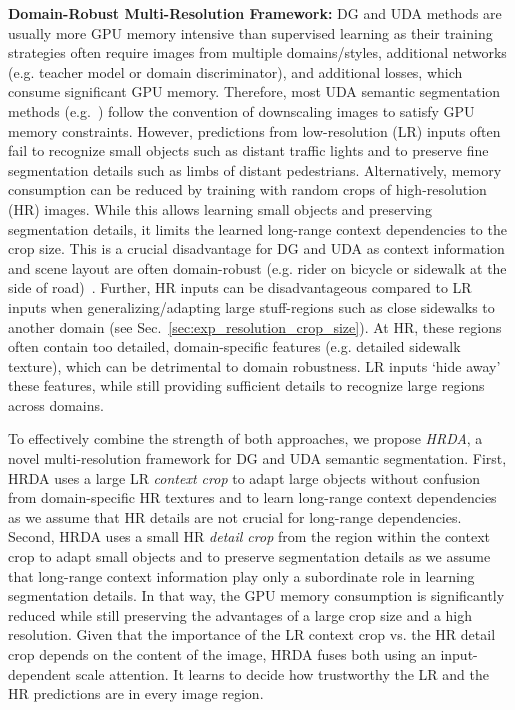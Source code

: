 \documentclass[journal,compsoc]{IEEEtran}
\begin{document}
\noindent\textbf{Domain-Robust Multi-Resolution Framework:}
DG and UDA methods are usually more GPU memory intensive than supervised learning as their training strategies often require images from multiple domains/styles, additional networks (e.g. teacher model or domain discriminator), and additional losses, which consume significant GPU memory.
Therefore, most UDA semantic segmentation methods (e.g.~\cite{tsai2018learning, tranheden2021dacs, araslanov2021self, wang2021domain}) follow the convention of downscaling images to satisfy GPU memory constraints.
However, predictions from low-resolution (LR) inputs often fail to recognize small objects such as distant traffic lights and to preserve fine segmentation details such as limbs of distant pedestrians. Alternatively, memory consumption can be reduced by training with random crops of high-resolution (HR) images. While this allows learning small objects and preserving segmentation details, it limits the learned long-range context dependencies to the crop size. This is a crucial disadvantage for DG and UDA as context information and scene layout are often domain-robust (e.g. rider on bicycle or sidewalk at the side of road)~\cite{huang2020contextual, yang2021context}. Further, HR inputs can be disadvantageous compared to LR inputs when generalizing/adapting large stuff-regions such as close sidewalks to another domain (see Sec.~\ref{sec:exp_resolution_crop_size}).
At HR, these regions often contain too detailed, domain-specific features (e.g. detailed sidewalk texture), which can be detrimental to domain robustness. LR inputs `hide away' these features, while still providing sufficient details to recognize large regions across domains.


To effectively combine the strength of both approaches, we propose \emph{HRDA}, a novel multi-resolution framework for DG and UDA semantic segmentation.
First, HRDA uses a large LR \emph{context crop} to adapt large objects without confusion from domain-specific HR textures and to learn long-range context dependencies as we assume that HR details are not crucial for long-range dependencies.
Second, HRDA uses a small HR \emph{detail crop} from the region within the context crop to adapt small objects and to preserve segmentation details as we assume that long-range context information play only a subordinate role in learning segmentation details. In that way, the GPU memory consumption is significantly reduced while still preserving the advantages of a large crop size and a high resolution. 
Given that the importance of the LR context crop vs. the HR detail crop depends on the content of the image, HRDA fuses both using an input-dependent scale attention. It learns to decide how trustworthy the LR and the HR predictions are in every image region.
\end{document}

